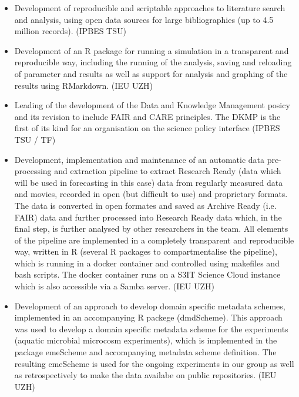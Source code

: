 \documentclass[a4paper]{article}
\begin{document}
\begin{itemize}[leftmargin=1.1in]

\item Development of reproducible and scriptable approaches to literature search
	and analysis, using open data sources for large bibliographies (up to 4.5 
	million records). (IPBES TSU)

\item Development of an R package for running a simulation in a
	transparent and reproducible way, including the running of the
	analysis, saving and reloading of parameter and results as well as
	support for analysis and graphing of the results using RMarkdown. (IEU UZH)

\item Leading of the development of the Data and Knowledge Management posicy and 
	its revision to include FAIR and CARE principles. The DKMP is the first of 
	its kind for an organisation on the science policy interface (IPBES TSU / TF)

\item Development, implementation and maintenance of an automatic data
	pre-processing and extraction pipeline to extract Research Ready
	(data which will be used in forecasting in this case) data from
	regularly measured data and movies, recorded in open (but
	difficult to use) and proprietary formats. The data is converted in
	open formates and saved as Archive Ready (i.e. FAIR) data and further
	processed into Research Ready data which, in the final step,  is
	further analysed by other researchers in the team. All elements of
	the pipeline are implemented in a completely transparent and
	reproducible way, written in R (several R packages to
	compartmentalise the pipeline), which is running in a docker
	container and controlled using makefiles and bash scripts. The docker
	container runs on a S3IT Science Cloud instance which is also
	accessible via a Samba server. (IEU UZH)

\item Development of an approach to develop domain specific metadata
	schemes, implemented in an accompanying R packege (dmdScheme). This
	approach was used to develop a domain specific metadata scheme for
	the experiments (aquatic microbial microcosm experiments), which is
	implemented in the package emeScheme and accompanying metadata scheme
	definition. The resulting emeScheme is used for the ongoing
	experiments in our group as well as retrospectively to make the data
	availabe on public repositories. (IEU UZH)


\end{itemize}
\end{document}
